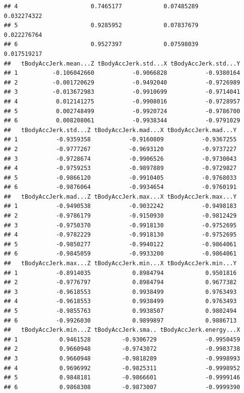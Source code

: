 \documentclass[
]{article}
\begin{document}
\begin{verbatim}
## 4                     0.7465177            0.07485289           0.032274322
## 5                     0.9285952            0.07837679           0.022276764
## 6                     0.9527397            0.07598039           0.017519217
##   tBodyAccJerk.mean...Z tBodyAccJerk.std...X tBodyAccJerk.std...Y
## 1          -0.106042660           -0.9066828           -0.9380164
## 2          -0.001720629           -0.9492040           -0.9726989
## 3          -0.013672983           -0.9910699           -0.9714041
## 4           0.012141275           -0.9908016           -0.9728957
## 5           0.002748499           -0.9920724           -0.9786700
## 6           0.008208061           -0.9938344           -0.9791029
##   tBodyAccJerk.std...Z tBodyAccJerk.mad...X tBodyAccJerk.mad...Y
## 1           -0.9359358           -0.9160809           -0.9367255
## 2           -0.9777267           -0.9693120           -0.9737227
## 3           -0.9728674           -0.9906526           -0.9730043
## 4           -0.9759253           -0.9897889           -0.9729827
## 5           -0.9866120           -0.9910405           -0.9768033
## 6           -0.9876064           -0.9934654           -0.9760191
##   tBodyAccJerk.mad...Z tBodyAccJerk.max...X tBodyAccJerk.max...Y
## 1           -0.9490538           -0.9032242           -0.9498183
## 2           -0.9786179           -0.9150930           -0.9812429
## 3           -0.9750370           -0.9918130           -0.9752695
## 4           -0.9782229           -0.9918130           -0.9752695
## 5           -0.9850277           -0.9940122           -0.9864061
## 6           -0.9845059           -0.9933200           -0.9864061
##   tBodyAccJerk.max...Z tBodyAccJerk.min...X tBodyAccJerk.min...Y
## 1           -0.8914035            0.8984794            0.9501816
## 2           -0.9776797            0.8984794            0.9677382
## 3           -0.9618553            0.9938499            0.9763493
## 4           -0.9618553            0.9938499            0.9763493
## 5           -0.9855763            0.9938507            0.9802494
## 6           -0.9926030            0.9899897            0.9886713
##   tBodyAccJerk.min...Z tBodyAccJerk.sma.. tBodyAccJerk.energy...X
## 1            0.9461528         -0.9306729              -0.9950459
## 2            0.9660948         -0.9743072              -0.9983738
## 3            0.9660948         -0.9818289              -0.9998993
## 4            0.9696992         -0.9825311              -0.9998952
## 5            0.9848181         -0.9866601              -0.9999146
## 6            0.9868308         -0.9873007              -0.9999390

\end{verbatim}
\end{document}
